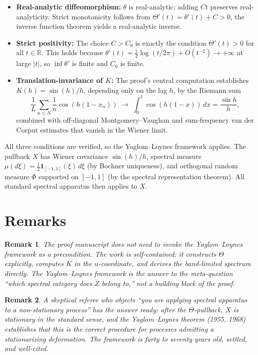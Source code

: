 \documentclass[11pt]{amsart}
\theoremstyle{plain}
\newtheorem{remark}{Remark}
\newcommand{\R}{\mathbb{R}}
\begin{document}
\begin{itemize}
\item \textbf{Real-analytic diffeomorphism:} $\theta$ is real-analytic; adding $Ct$ preserves real-analyticity. Strict monotonicity follows from $\Theta'(t) = \theta'(t) + C > 0$, the inverse function theorem yields a real-analytic inverse.

\item \textbf{Strict positivity:} The choice $C > C_0$ is exactly the condition $\Theta'(t) > 0$ for all $t \in \R$. This holds because $\theta'(t) = \tfrac{1}{2}\log(t/2\pi) + O(t^{-2}) \to +\infty$ at large $|t|$, so $\inf \theta'$ is finite and $C_0$ is finite.

\item \textbf{Translation-invariance of $K$:} The proof's central computation establishes $K(h) = \sin(h)/h$, depending only on the lag $h$, by the Riemann sum
\[
\frac{1}{L}\sum_{n \leq N}\frac{1}{n}\cos(h(1-x_n)) \;\longrightarrow\; \int_0^1 \cos(h(1-x))\,dx = \frac{\sin h}{h},
\]
combined with off-diagonal Montgomery--Vaughan and sum-frequency van der Corput estimates that vanish in the Wiener limit.
\end{itemize}

All three conditions are verified, so the Yaglom--Loynes framework applies. The pullback $X$ has Wiener covariance $\sin(h)/h$, spectral measure $\mu(d\xi) = \tfrac{1}{2}\mathbf{1}_{[-1,1]}(\xi)\, d\xi$ (by Bochner uniqueness), and orthogonal random measure $\Phi$ supported on $[-1, 1]$ (by the spectral representation theorem). All standard spectral apparatus then applies to $X$.

\section{Remarks}

\begin{remark}
The proof manuscript does not need to invoke the Yaglom--Loynes framework as a precondition. The work is self-contained: it constructs $\Theta$ explicitly, computes $K$ in the $u$-coordinate, and derives the band-limited spectrum directly. The Yaglom--Loynes framework is the answer to the meta-question ``which spectral category does $Z$ belong to,'' not a building block of the proof.
\end{remark}

\begin{remark}
A skeptical referee who objects ``you are applying spectral apparatus to a non-stationary process'' has the answer ready: \emph{after the $\Theta$-pullback, $X$ is stationary in the standard sense, and the Yaglom--Loynes theorem (1955, 1968) establishes that this is the correct procedure for processes admitting a stationarizing deformation.} The framework is forty to seventy years old, settled, and well-cited.
\end{remark}
\end{document}
